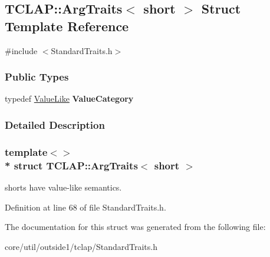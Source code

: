 \hypertarget{structTCLAP_1_1ArgTraits_3_01short_01_4}{}\subsection{T\+C\+L\+AP\+:\+:Arg\+Traits$<$ short $>$ Struct Template Reference}
\label{structTCLAP_1_1ArgTraits_3_01short_01_4}


{\ttfamily \#include $<$Standard\+Traits.\+h$>$}

\subsubsection*{Public Types}
\begin{DoxyCompactItemize}
\item 
typedef \hyperlink{structTCLAP_1_1ValueLike}{Value\+Like} {\bfseries Value\+Category}\hypertarget{structTCLAP_1_1ArgTraits_3_01short_01_4_a99f5d76501b120d6455b528aa7bf6896}{}\label{structTCLAP_1_1ArgTraits_3_01short_01_4_a99f5d76501b120d6455b528aa7bf6896}

\end{DoxyCompactItemize}


\subsubsection{Detailed Description}
\subsubsection*{template$<$$>$\\*
struct T\+C\+L\+A\+P\+::\+Arg\+Traits$<$ short $>$}

shorts have value-\/like semantics. 

Definition at line 68 of file Standard\+Traits.\+h.



The documentation for this struct was generated from the following file\+:\begin{DoxyCompactItemize}
\item 
core/util/outside1/tclap/Standard\+Traits.\+h\end{DoxyCompactItemize}
